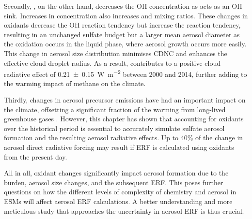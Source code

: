 Secondly, , on the other hand, decreases the OH concentration as  acts as an OH sink. Increases in  concentration also increases  and  mixing ratios. These changes in oxidants decrease the OH reaction tendency but increase the  reaction tendency, resulting in an unchanged sulfate budget but a larger mean aerosol diameter as the  oxidation occurs in the liquid phase, where aerosol growth occurs more easily. This change in aerosol size distribution minimises CDNC and enhances the effective cloud droplet radius. As a result, contributes to a positive cloud radiative effect of \qty{0.21+-0.15}{\watt\per\metre\squared} between 2000 and 2014, further adding to the warming impact of methane on the climate.


Thirdly, changes in aerosol precursor emissions have had an important impact on the climate, offsetting a significant fraction of the warming from long-lived greenhouse gases \citep{szopaShortlivedClimateForcers2021}. However, this chapter has shown that accounting for oxidants over the historical period is essential to accurately simulate sulfate aerosol formation and the resulting aerosol radiative effects. Up to 40\% of the change in aerosol direct radiative forcing may result if ERF is calculated using oxidants from the present day.


All in all, oxidant changes significantly impact aerosol formation due to the burden, aerosol size changes, and the subsequent ERF. This poses further questions on how the different levels of complexity of chemistry and aerosol in ESMs will affect aerosol ERF calculations. A better understanding and more meticulous study that approaches the uncertainty in aerosol ERF is thus crucial.